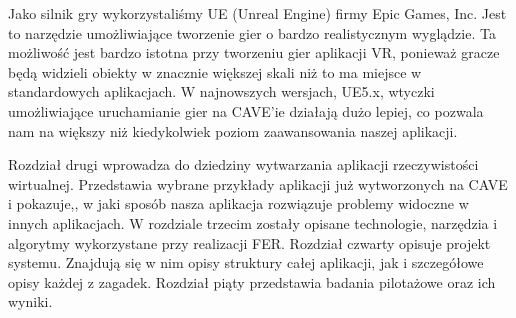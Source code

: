 Jako silnik gry wykorzystaliśmy UE (Unreal Engine) firmy Epic Games, Inc. 
Jest to narzędzie umożliwiające tworzenie gier o bardzo realistycznym wyglądzie.
Ta możliwość jest bardzo istotna przy tworzeniu gier aplikacji VR, ponieważ gracze będą widzieli obiekty w znacznie większej skali niż to ma miejsce w standardowych aplikacjach.
W najnowszych wersjach, UE5.x, wtyczki umożliwiające uruchamianie gier na CAVE'ie działają dużo lepiej, co pozwala nam na większy niż kiedykolwiek poziom zaawansowania naszej aplikacji.

Rozdział drugi wprowadza do dziedziny wytwarzania aplikacji rzeczywistości wirtualnej. Przedstawia wybrane przykłady aplikacji już wytworzonych na CAVE i pokazuje,, w jaki sposób nasza aplikacja rozwiązuje problemy widoczne w innych aplikacjach.
W rozdziale trzecim zostały opisane technologie, narzędzia i algorytmy wykorzystane przy realizacji FER.
Rozdział czwarty opisuje projekt systemu. Znajdują się w nim opisy struktury całej aplikacji, jak i szczegółowe opisy każdej z zagadek.
Rozdział piąty przedstawia badania pilotażowe oraz ich wyniki.

